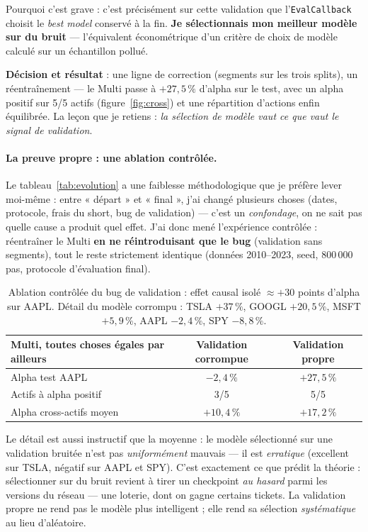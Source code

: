 \documentclass[11pt,a4paper]{article}
\newcommand{\ok}[1]{\textcolor{okgreen}{#1}}
\newcommand{\ko}[1]{\textcolor{kored}{#1}}
\newcommand{\code}[1]{\texttt{#1}}
\begin{document}
Pourquoi c'est grave : c'est précisément sur cette validation que l'\code{EvalCallback}
choisit le \emph{best model} conservé à la fin. \textbf{Je sélectionnais mon meilleur
modèle sur du bruit} --- l'équivalent économétrique d'un critère de choix de modèle
calculé sur un échantillon pollué.

\textbf{Décision et résultat} : une ligne de correction (segments sur les trois splits),
un réentraînement --- le Multi passe à \ok{$+27{,}5\,\%$ d'alpha} sur le test, avec un
alpha positif sur \ok{5/5 actifs} (figure~\ref{fig:cross}) et une répartition d'actions
enfin équilibrée. La leçon que je retiens : \emph{la sélection de modèle vaut ce que
vaut le signal de validation}.

\paragraph{La preuve propre : une ablation contrôlée.}
Le tableau~\ref{tab:evolution} a une faiblesse méthodologique que je préfère lever
moi-même : entre « départ » et « final », j'ai changé plusieurs choses (dates,
protocole, frais du short, bug de validation) --- c'est un \emph{confondage}, on ne
sait pas quelle cause a produit quel effet. J'ai donc mené l'expérience contrôlée :
réentraîner le Multi \textbf{en ne réintroduisant que le bug} (validation sans
segments), tout le reste strictement identique (données 2010--2023, seed, 800\,000
pas, protocole d'évaluation final).

\begin{table}[H]
\centering\small
\begin{tabular}{@{}lcc@{}}
\toprule
\textbf{Multi, toutes choses égales par ailleurs} & \textbf{Validation corrompue} & \textbf{Validation propre} \\
\midrule
Alpha test AAPL & \ko{$-2{,}4\,\%$} & \ok{$+27{,}5\,\%$} \\
Actifs à alpha positif & 3/5 & \ok{5/5} \\
Alpha cross-actifs moyen & $+10{,}4\,\%$ & \ok{$+17{,}2\,\%$} \\
\bottomrule
\end{tabular}
\caption{Ablation contrôlée du bug de validation : effet causal isolé $\approx +30$
points d'alpha sur AAPL. Détail du modèle corrompu : TSLA $+37\,\%$, GOOGL $+20{,}5\,\%$,
MSFT $+5{,}9\,\%$, AAPL $-2{,}4\,\%$, SPY $-8{,}8\,\%$.}
\label{tab:ablationbug}
\end{table}

Le détail est aussi instructif que la moyenne : le modèle sélectionné sur une
validation bruitée n'est pas \emph{uniformément} mauvais --- il est \emph{erratique}
(excellent sur TSLA, négatif sur AAPL et SPY). C'est exactement ce que prédit la
théorie : sélectionner sur du bruit revient à tirer un checkpoint \emph{au hasard}
parmi les versions du réseau --- une loterie, dont on gagne certains tickets. La
validation propre ne rend pas le modèle plus intelligent ; elle rend sa sélection
\emph{systématique} au lieu d'aléatoire.
\end{document}
